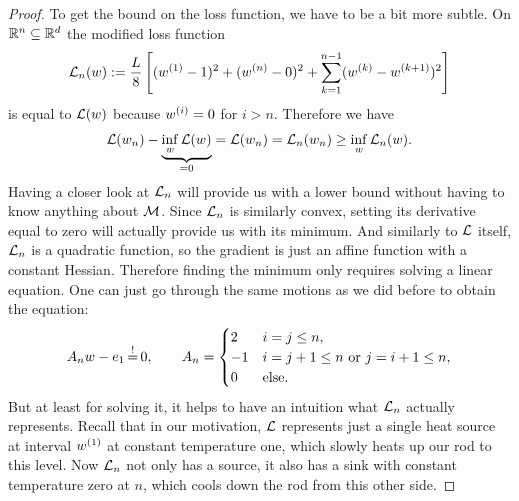 \begin{proof}
	To get the bound on the loss function, we have to be a bit more subtle.
	On \(\mathbb{R}^n\subseteq \mathbb{R}^d\) the modified loss function
	\begin{align}\label{eq: sink loss}
		\mathcal{L}_n(w) := \frac{L}{8}\left[
			(w^{(1)} -1)^2
			+ (w^{(n)} - 0)^2
			+ \sum_{k=1}^{n-1} (w^{(k)} - w^{(k+1)})^2
		\right]
	\end{align}
	is equal to \(\mathcal{L}(w)\) because \(w^{(i)}=0\) for \(i>n\).
	Therefore we have
	\begin{align*}
		\mathcal{L}(w_n) - \underbrace{\inf_{w}\mathcal{L}(w)}_{=0}
		= \mathcal{L}(w_n) = \mathcal{L}_n(w_n)
		\ge \inf_{w}\mathcal{L}_n(w).
	\end{align*}
	Having a closer look at \(\mathcal{L}_n\) will provide us with a lower bound
	without having to know anything about \(\mathcal{M}\). Since \(\mathcal{L}_n\)
	is similarly convex, setting its derivative equal to zero will actually provide us
	with its minimum. And similarly to \(\mathcal{L}\) itself, \(\mathcal{L}_n\) is a
	quadratic function, so the gradient is just an affine function with a
	constant Hessian. Therefore finding the minimum only requires solving
	a linear equation. One can just go through the same motions as we did
	before to obtain the equation:
	\begin{align}\label{eq: optimality condition for sink loss}
		A_n \weights - \stdBasis_1 \xeq{!} 0, \qquad
		A_n =\begin{cases}
			2 & i=j\le n, \\
			-1 & i=j+1\le n \text{ or } j=i+1\le n, \\
			0 & \text{else}.
		\end{cases}
	\end{align}
	But at least for solving it, it helps to have an intuition what \(\mathcal{L}_n\)
	actually represents. Recall that in our motivation, \(\mathcal{L}\) represents just
	a single heat source at interval \(w^{(1)}\) at constant
	temperature one, which slowly heats up our rod to this level. Now
	\(\mathcal{L}_n\) not only has a source, it also has a sink with constant
	temperature zero at \(n\), which cools down the rod from this other side.


\end{proof}
